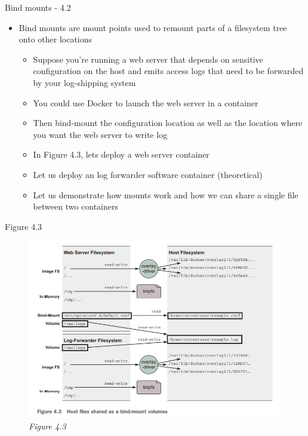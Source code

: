\documentclass[ignorenonframetext,]{beamer}
\providecommand{\tightlist}{%
  \setlength{\itemsep}{0pt}\setlength{\parskip}{0pt}}
\begin{document}
\begin{frame}{Bind mounts - 4.2}
\protect\hypertarget{bind-mounts---4.2}{}

\begin{itemize}
\tightlist
\item
  Bind mounts are mount points used to remount parts of a filesystem
  tree onto other locations

  \begin{itemize}
  \tightlist
  \item
    Suppose you're running a web server that depends on sensitive
    configuration on the host and emits access logs that need to be
    forwarded by your log-shipping system
  \item
    You could use Docker to launch the web server in a container
  \item
    Then bind-mount the configuration location as well as the location
    where you want the web server to write log
  \item
    In Figure 4.3, lets deploy a web server container
  \item
    Let us deploy an log forwarder software container (theoretical)
  \item
    Let us demonstrate how mounts work and how we can share a single
    file between two containers
  \end{itemize}
\end{itemize}

\end{frame}

\begin{frame}{Figure 4.3}
\protect\hypertarget{figure-4.3}{}

\begin{figure}
\centering
\includegraphics{./tex2pdf.-d218b5bed17bed47/b91c6062cd754d14e9e2e48bb29d473be7819b94.png}
\caption{\emph{Figure 4.3}}
\end{figure}

\end{frame}
\end{document}
